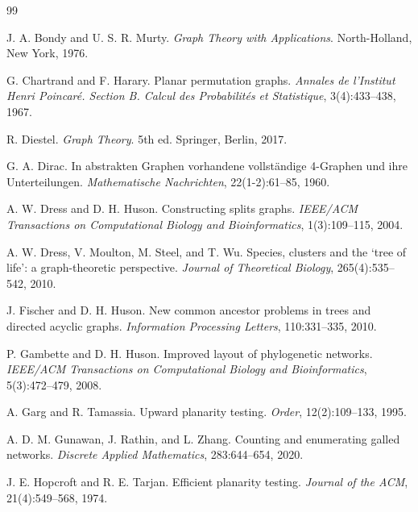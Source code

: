 \documentclass[pdflatex,sn-mathphys-num]{sn-jnl}
\theoremstyle{thmstyleone}%
\theoremstyle{thmstyletwo}%
\theoremstyle{thmstylethree}%
\begin{document}
\begin{thebibliography}{99}

J. A. Bondy and U. S. R. Murty.
\textit{Graph Theory with Applications}.
North-Holland, New York, 1976.


G. Chartrand and F. Harary.
Planar permutation graphs.
\textit{Annales de l'Institut Henri Poincar{\'e}. Section B. Calcul des Probabilit{\'e}s et Statistique},
3(4):433--438, 1967.



R. Diestel.
\textit{Graph Theory}.
5th ed.
Springer, Berlin, 2017.

G. A. Dirac.
In abstrakten {G}raphen vorhandene vollst{\"a}ndige 4-{G}raphen und ihre {U}nterteilungen.
\textit{Mathematische Nachrichten},
22(1-2):61--85, 1960.

A. W. Dress and D. H. Huson.
Constructing splits graphs.
\textit{IEEE/ACM Transactions on Computational Biology and Bioinformatics},
1(3):109--115, 2004.



A. W. Dress, V. Moulton, M. Steel, and T. Wu.
Species, clusters and the `tree of life': a graph-theoretic perspective.
\textit{Journal of Theoretical Biology},
265(4):535--542, 2010.



J. Fischer and D. H. Huson.
New common ancestor problems in trees and directed acyclic graphs.
\textit{Information Processing Letters},
110:331--335, 2010.

P. Gambette and D. H. Huson.
Improved layout of phylogenetic networks.
\textit{IEEE/ACM Transactions on Computational Biology and Bioinformatics},
5(3):472--479, 2008.

A. Garg and R. Tamassia.
Upward planarity testing.
\textit{Order},
12(2):109--133, 1995.

A. D. M. Gunawan, J. Rathin, and L. Zhang.
Counting and enumerating galled networks.
\textit{Discrete Applied Mathematics},
283:644--654, 2020.

J. E. Hopcroft and R. E. Tarjan.
Efficient planarity testing.
\textit{Journal of the ACM},
21(4):549--568, 1974.


\end{thebibliography}
\end{document}
